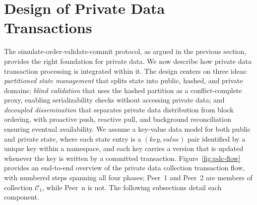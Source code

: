 \section{Design of Private Data Transactions}
\label{s:design}
The simulate-order-validate-commit protocol, as argued in the previous section, provides the right foundation for private data. We now describe how private data transaction processing is integrated within it.
The design centers on three ideas: \textit{partitioned state management} that splits state into public, hashed, and private domains; \textit{blind validation} that uses the hashed partition as a conflict-complete proxy, enabling serializability checks without accessing private data; and \textit{decoupled dissemination} that separates private data distribution from block ordering, with proactive push, reactive pull, and background reconciliation ensuring eventual availability. We assume a key-value data model for both public and private state, where each state entry is a $(key, value)$ pair identified by a unique key within a namespace,
and each key carries a version that is updated whenever the key is written by a committed transaction. Figure~\ref{fig:pdc-flow} provides an end-to-end overview of the private data collection transaction flow,
with numbered steps spanning all four phases; Peer~1 and Peer~2 are members of collection $\mathcal{C}_1$, while Peer~n is not. The following subsections detail each component.

